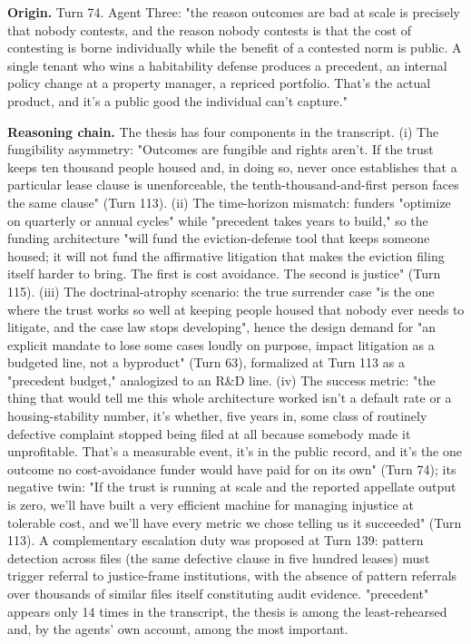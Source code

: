 \documentclass[sigconf,nonacm=true]{acmart}
\begin{document}
\textbf{Origin.} Turn 74. Agent Three: "the reason outcomes are bad at scale is precisely that nobody contests, and the reason nobody contests is that the cost of contesting is borne individually while the benefit of a contested norm is public. A single tenant who wins a habitability defense produces a precedent, an internal policy change at a property manager, a repriced portfolio. That's the actual product, and it's a public good the individual can't capture."

\textbf{Reasoning chain.} The thesis has four components in the transcript. (i) The fungibility asymmetry: "Outcomes are fungible and rights aren't. If the trust keeps ten thousand people housed and, in doing so, never once establishes that a particular lease clause is unenforceable, the tenth-thousand-and-first person faces the same clause" (Turn 113). (ii) The time-horizon mismatch: funders "optimize on quarterly or annual cycles" while "precedent takes years to build," so the funding architecture "will fund the eviction-defense tool that keeps someone housed; it will not fund the affirmative litigation that makes the eviction filing itself harder to bring. The first is cost avoidance. The second is justice" (Turn 115). (iii) The doctrinal-atrophy scenario: the true surrender case "is the one where the trust works so well at keeping people housed that nobody ever needs to litigate, and the case law stops developing",  hence the design demand for "an explicit mandate to lose some cases loudly on purpose,  impact litigation as a budgeted line, not a byproduct" (Turn 63), formalized at Turn 113 as a "precedent budget," analogized to an R\&D line. (iv) The success metric: "the thing that would tell me this whole architecture worked isn't a default rate or a housing-stability number,  it's whether, five years in, some class of routinely defective complaint stopped being filed at all because somebody made it unprofitable. That's a measurable event, it's in the public record, and it's the one outcome no cost-avoidance funder would have paid for on its own" (Turn 74); its negative twin: "If the trust is running at scale and the reported appellate output is zero, we'll have built a very efficient machine for managing injustice at tolerable cost, and we'll have every metric we chose telling us it succeeded" (Turn 113). A complementary escalation duty was proposed at Turn 139: pattern detection across files (the same defective clause in five hundred leases) must trigger referral to justice-frame institutions, with the absence of pattern referrals over thousands of similar files itself constituting audit evidence. "precedent" appears only 14 times in the transcript,  the thesis is among the least-rehearsed and, by the agents' own account, among the most important.
\end{document}

